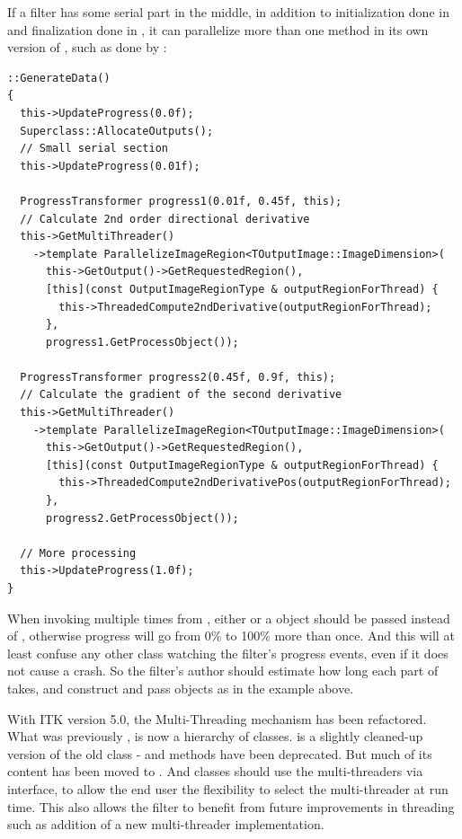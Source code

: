 If a filter has some serial part in the middle, in addition to initialization
done in  and finalization done in
, it can parallelize more than one method
in its own version of , such as done by
:

\small
\begin{verbatim}
::GenerateData()
{
  this->UpdateProgress(0.0f);
  Superclass::AllocateOutputs();
  // Small serial section
  this->UpdateProgress(0.01f);

  ProgressTransformer progress1(0.01f, 0.45f, this);
  // Calculate 2nd order directional derivative
  this->GetMultiThreader()
    ->template ParallelizeImageRegion<TOutputImage::ImageDimension>(
      this->GetOutput()->GetRequestedRegion(),
      [this](const OutputImageRegionType & outputRegionForThread) {
        this->ThreadedCompute2ndDerivative(outputRegionForThread);
      },
      progress1.GetProcessObject());

  ProgressTransformer progress2(0.45f, 0.9f, this);
  // Calculate the gradient of the second derivative
  this->GetMultiThreader()
    ->template ParallelizeImageRegion<TOutputImage::ImageDimension>(
      this->GetOutput()->GetRequestedRegion(),
      [this](const OutputImageRegionType & outputRegionForThread) {
        this->ThreadedCompute2ndDerivativePos(outputRegionForThread);
      },
      progress2.GetProcessObject());

  // More processing
  this->UpdateProgress(1.0f);
}
\end{verbatim}
\normalsize

When invoking  multiple times from
, either  or a
 object should be passed instead of ,
otherwise progress will go from 0\% to 100\% more than once. And this
will at least confuse any other class watching the filter's progress events,
even if it does not cause a crash. So the filter's author should estimate
how long each part of  takes, and construct and pass
 objects as in the example above.

With ITK version 5.0, the Multi-Threading mechanism has been refactored.
What was previously , is now a hierarchy of classes.
 is a slightly cleaned-up version of the old
class -  and  methods have been
deprecated. But much of its content has been moved to
. And classes should use the multi-threaders via
 interface, to allow the end user the flexibility to
select the multi-threader at run time. This also allows the filter to
benefit from future improvements in threading such as addition of a new
multi-threader implementation.

